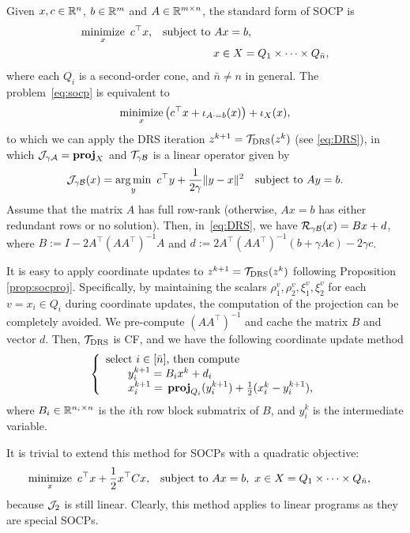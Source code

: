 {{{Given $x,c\in\mathbb{R}^n$, $b\in\mathbb{R}^m$ and $A\in\mathbb{R}^{m\times n}$, the standard form of SOCP is
\begin{subequations}\label{eq:socp}
\begin{align}
\Min_x~c^\top x,&\quad\St~ Ax=b,\\
&\hspace{56pt} x\in X=Q_1\times \cdots\times Q_{\bar{n}},
\end{align}
\end{subequations}
where each $Q_i$ is a second-order cone, and $\bar{n}\not=n$ in general.
The problem~\eqref{eq:socp} is equivalent to
$$\operatorname*{minimize}_x \big(c^\top  x+\iota_{A\cdot =b}(x)\big)+\iota_X(x),$$
to which we can apply the DRS iteration $z^{k+1} = {{\mathcal{T}}_{\mathrm{DRS}}} (z^k)$ (see \eqref{eq:DRS}), in which ${\mathcal{J}}_{\gamma {\mathcal{A}}} = {\mathbf{proj}}_X$ and ${\mathcal{T}}_{\gamma {\mathcal{B}}}$ is a linear operator given by
$${\mathcal{J}}_{\gamma {\mathcal{B}}} (x) = \operatorname*{arg\,min}_y ~ c^\top y+  \frac{1}{2\gamma}\|y-x\|^2\quad {\mathrm{subject~to}}~ Ay=b.$$
Assume that the matrix $A$ has full row-rank (otherwise, $Ax=b$ has either redundant rows or no solution).
Then, in~\eqref{eq:DRS}, we have ${\mathcal{R}}_{\gamma {\mathcal{B}}}(x)= Bx+d$, where $B:=I-2A^\top (AA^\top )^{-1}A$ and $d:=2A^\top (AA^\top )^{-1}(b+\gamma Ac)-2\gamma c$.

It is easy to apply coordinate updates to $z^{k+1} = {{\mathcal{T}}_{\mathrm{DRS}}} (z^k)$ following Proposition \ref{prop:socproj}. Specifically, by maintaining the scalars $\rho_1^v,\rho_2^v,\xi_1^v,\xi_2^v$ for each $v=x_i\in Q_i$ during  coordinate updates, the computation of the projection can be completely avoided. We pre-compute $(AA^\top )^{-1}$ and cache the matrix $B$ and vector $d$. Then, ${{\mathcal{T}}_{\mathrm{DRS}}}$ is CF, and we have the following coordinate update method
\begin{equation}\label{cf-cone}
{\left\{
\begin{array}{l}
\text{select $i \in [\bar{n}]$, then compute}\\
\qquad y^{k+1}_i = B_i x^k + d_i \\
\qquad x_i^{k+1}=\,\prj_{Q_i}(y_i^{k+1}) + \frac{1}{2} ( x_i^k - y_i^{k+1}), \\
\end{array}
\right.
}\end{equation}
where $B_i \in \mathbb{R}^{n_i \times n}$ is the $i$th row block submatrix of $B$, and $y_i^k$ is the intermediate variable.


It is trivial to extend this method for  SOCPs with a quadratic objective:
\begin{align*}
\Min_x~c^\top x+\frac{1}{2}x^\top Cx,&\quad\St~ Ax=b,~ x\in X=Q_1\times \cdots\times Q_{\bar{n}},
\end{align*}
because ${\mathcal{J}}_2$ is still linear.  Clearly, this method applies to linear programs as they are special SOCPs.

}}}
